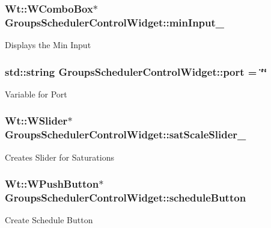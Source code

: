 \subsubsection[{\texorpdfstring{min\+Input\+\_\+}{minInput_}}]{\setlength{\rightskip}{0pt plus 5cm}Wt\+::\+W\+Combo\+Box$\ast$ Groups\+Scheduler\+Control\+Widget\+::min\+Input\+\_\+\hspace{0.3cm}{\ttfamily [private]}}\hypertarget{classGroupsSchedulerControlWidget_a6a6fb7a92738b2fed2e052106c7f257f}{}\label{classGroupsSchedulerControlWidget_a6a6fb7a92738b2fed2e052106c7f257f}
Displays the Min Input 
\subsubsection[{\texorpdfstring{port}{port}}]{\setlength{\rightskip}{0pt plus 5cm}std\+::string Groups\+Scheduler\+Control\+Widget\+::port = \char`\"{}\char`\"{}\hspace{0.3cm}{\ttfamily [private]}}\hypertarget{classGroupsSchedulerControlWidget_ab6667e25970ca796cf01b6053d8ba9c0}{}\label{classGroupsSchedulerControlWidget_ab6667e25970ca796cf01b6053d8ba9c0}
Variable for Port 
\subsubsection[{\texorpdfstring{sat\+Scale\+Slider\+\_\+}{satScaleSlider_}}]{\setlength{\rightskip}{0pt plus 5cm}Wt\+::\+W\+Slider$\ast$ Groups\+Scheduler\+Control\+Widget\+::sat\+Scale\+Slider\+\_\+\hspace{0.3cm}{\ttfamily [private]}}\hypertarget{classGroupsSchedulerControlWidget_a26e978342e055724e5207c3feef19ad5}{}\label{classGroupsSchedulerControlWidget_a26e978342e055724e5207c3feef19ad5}
Creates Slider for Saturations 
\subsubsection[{\texorpdfstring{schedule\+Button}{scheduleButton}}]{\setlength{\rightskip}{0pt plus 5cm}Wt\+::\+W\+Push\+Button$\ast$ Groups\+Scheduler\+Control\+Widget\+::schedule\+Button\hspace{0.3cm}{\ttfamily [private]}}\hypertarget{classGroupsSchedulerControlWidget_a17701e3e2e6b51e7647120900f15d25a}{}\label{classGroupsSchedulerControlWidget_a17701e3e2e6b51e7647120900f15d25a}
Create Schedule Button 
